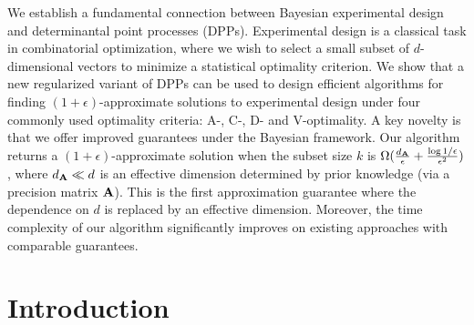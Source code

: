 \documentclass[thesis.tex]{subfiles}
\begin{document}
%



We establish a fundamental connection between Bayesian
experimental design and determinantal point processes
(DPPs). Experimental design is a classical task in combinatorial
optimization, where we wish to select a small subset of $d$-dimensional
 vectors to minimize a statistical optimality criterion.
 We show that a new regularized variant of
 DPPs can be used to design
efficient algorithms for finding $(1+\epsilon)$-approximate solutions
to experimental design under four commonly used optimality
criteria: A-, C-, D- and V-optimality. A key novelty is that we offer
improved guarantees under the Bayesian framework.
Our algorithm returns a $(1+\epsilon)$-approximate solution when the
subset size $k$ is
$\Omega(\frac{d_{\mathbf A}}{\epsilon} + \frac{\log
1/\epsilon}{\epsilon^2})$, where $d_{\mathbf A}\ll d$ is an effective dimension
determined by prior knowledge (via a precision matrix $\mathbf A$). This is the first
approximation guarantee where the dependence on $d$ is
replaced by an effective dimension. Moreover, the time complexity
of our algorithm significantly improves on existing approaches
with comparable guarantees. 


\section{Introduction}
\end{document}
